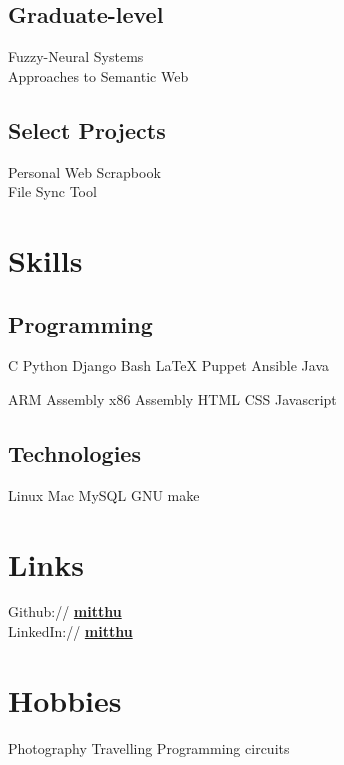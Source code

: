 \documentclass[]{deedy}
\begin{document}
\begin{minipage}[t]{0.33\textwidth}
\subsection{Graduate-level}
Fuzzy-Neural Systems \\
Approaches to Semantic Web \\
\sectionsep

\subsection{Select Projects}
Personal Web Scrapbook\\
File Sync Tool


\section{Skills}
\subsection{Programming}
C \textbullet{} Python \textbullet{} Django \textbullet{} Bash \textbullet{} \LaTeX \textbullet{} Puppet \textbullet{} Ansible \textbullet{} Java
\sectionsep

ARM Assembly \textbullet{} x86 Assembly \textbullet{} HTML \textbullet{} CSS \textbullet{} Javascript
\sectionsep

\subsection{Technologies}
Linux \textbullet{} Mac \textbullet{} MySQL \textbullet{} GNU make


\section{Links} 
Github:// \href{https://github.com/mitthu}{\textbf{mitthu}} \\
LinkedIn://  \href{https://www.linkedin.com/in/mitthu}{\textbf{mitthu}}


\section{Hobbies}
Photography \textbullet{} Travelling \textbullet{} Programming circuits

%
%

\end{minipage} 
\end{document}
